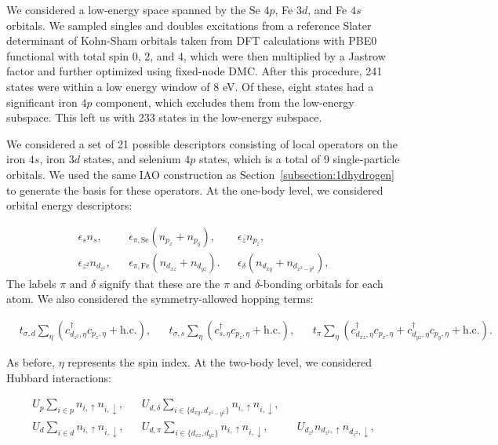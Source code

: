 We considered a low-energy space spanned by the Se $4p$, Fe $3d$, and Fe $4s$ orbitals. We sampled singles and doubles excitations from a reference Slater determinant 
of Kohn-Sham orbitals taken from DFT calculations with PBE0 functional with total spin 0, 2, and 4, which were then multiplied by a Jastrow factor and further optimized using fixed-node DMC. 
After this procedure, 241 states were within a low energy window of 8 eV. 
Of these, eight states had a significant iron $4p$ component, which excludes them from the low-energy subspace. 
This left us with 233 states in the low-energy subspace.

We considered a set of 21 possible descriptors consisting of local operators on the iron $4s$, iron $3d$ states, and selenium $4p$ states, which is a total of 9 single-particle orbitals.
We used the same IAO construction as Section~\ref{subsection:1dhydrogen} to generate the basis for these operators.
At the one-body level, we considered orbital energy descriptors: 

\begin{align}
  &\epsilon_{s} n_s,&
  &\epsilon_{\pi,\mathrm{Se}} (n_{p_x} + n_{p_y}), &
  &\epsilon_{z} n_{p_z},&
  \nonumber \\
  &\epsilon_{z^2} n_{d_{z^2}},& 
  &\epsilon_{\pi,\mathrm{Fe}} (n_{d_{xz}} + n_{d_{yz}}).& 
  &\epsilon_{\delta} (n_{d_{xy}} + n_{d_{x^2-y^2}}),&
\end{align}
The labels $\pi$ and $\delta$ signify that these are the $\pi$ and $\delta$-bonding orbitals for each atom. 
We also considered the symmetry-allowed hopping terms:

\begin{align}
  &t_{\sigma,d} \sum_{\eta} \left( c_{d_{z^2},\eta}^{\dagger} c_{p_z,\eta} + \text{h.c.} \right),&
  &t_{\sigma,s} \sum_{\eta} \left(c_{s,\eta}^{\dagger}  c_{p_z,\eta} + \text{h.c.} \right),&
  &t_{\pi} \sum_{\eta} \left(c_{d_{xz},\eta}^{\dagger}  c_{p_x,\eta} + c_{d_{yz},\eta}^{\dagger}  c_{p_y,\eta} + \text{h.c.} \right).&
\end{align}

As before, $\eta$ represents the spin index. At the two-body level, we considered Hubbard interactions:

\begin{align}
  &U_p \sum_{i \in p} n_{i,\uparrow} n_{i,\downarrow},&
  &U_{d,\delta} \sum_{i\in \{d_{xy},d_{x^2-y^2}\}} n_{i,\uparrow} n_{i,\downarrow},&
  \nonumber \\
  &U_d \sum_{i \in d} n_{i,\uparrow} n_{i,\downarrow},&
  &U_{d,\pi} \sum_{i\in \{d_{xz},d_{yz}\}} n_{i,\uparrow} n_{i,\downarrow},&
  &U_{d_{z^2}} n_{d_{z^2},\uparrow} n_{d_{z^2},\downarrow},&
\end{align}

